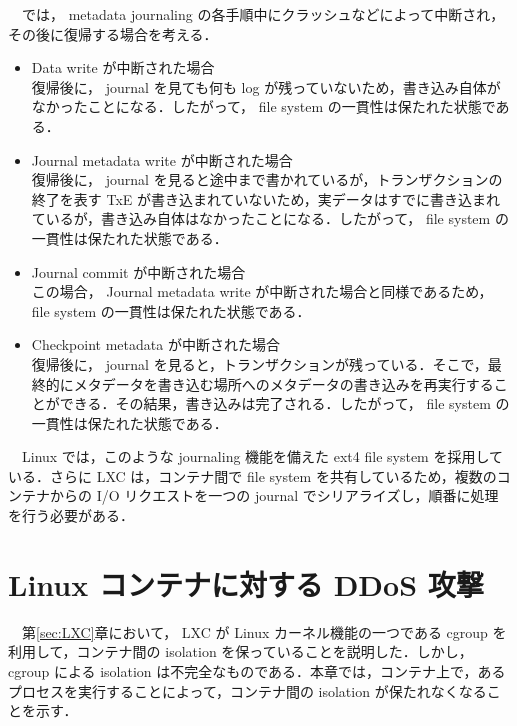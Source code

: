 \documentclass[graduation-thesis]{jsarticle}
\begin{document}
　では， metadata journaling の各手順中にクラッシュなどによって中断され，その後に復帰する場合を考える．\\
\begin{itemize}
	\item{Data write が中断された場合}\\
	復帰後に， journal を見ても何も log が残っていないため，書き込み自体がなかったことになる．したがって， file system の一貫性は保たれた状態である．\\
	\item{Journal metadata write が中断された場合}\\
	復帰後に， journal を見ると途中まで書かれているが，トランザクションの終了を表す TxE が書き込まれていないため，実データはすでに書き込まれているが，書き込み自体はなかったことになる．したがって， file system の一貫性は保たれた状態である．\\
	\item{Journal commit が中断された場合}\\
	この場合， Journal metadata write が中断された場合と同様であるため， file system の一貫性は保たれた状態である．\\
	\item{Checkpoint metadata が中断された場合}\\
	復帰後に， journal を見ると，トランザクションが残っている．そこで，最終的にメタデータを書き込む場所へのメタデータの書き込みを再実行することができる．その結果，書き込みは完了される．したがって， file system の一貫性は保たれた状態である．\\
\end{itemize}
　Linux では，このような journaling 機能を備えた ext4 file system を採用している．さらに LXC は，コンテナ間で file system を共有しているため，複数のコンテナからの I/O リクエストを一つの journal でシリアライズし，順番に処理を行う必要がある．

\clearpage
\section{Linux コンテナに対する DDoS 攻撃}
\label{sec:DDoS}
　第\ref{sec:LXC}章において， LXC が Linux カーネル機能の一つである cgroup を利用して，コンテナ間の isolation を保っていることを説明した．しかし， cgroup による isolation は不完全なものである．本章では，コンテナ上で，あるプロセスを実行することによって，コンテナ間の isolation が保たれなくなることを示す．\\
\end{document}
